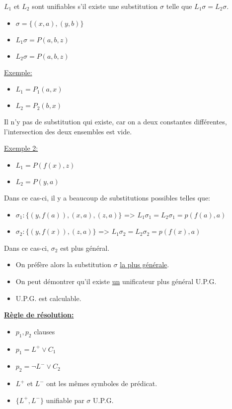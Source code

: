 \vspace{5 mm}
$L_1$ et $L_2$ sont unifiables s'il existe une substitution $\sigma$ telle que $L_1 \sigma = L_2 \sigma$.
\begin{itemize}
  \item $\sigma = \big\{(x,a),(y,b)\big\}$
  \item $L_1 \sigma = P(a,b,z)$
  \item $L_2 \sigma = P(a,b,z)$
\end{itemize}

\vspace{5 mm}
\underline{Exemple:}
\begin{itemize}
  \item $L_1 = P_1(a,x)$
  \item $L_2 = P_2(b,x)$
\end{itemize}

Il n'y pas de substitution qui existe, car on a deux constantes différentes, l'intersection des deux ensembles est vide.
\smallskip

\underline{Exemple 2:}

\begin{itemize}
  \item $L_1 = P(f(x), z)$ 
  \item $L_2 = P(y, a)$
\end{itemize}

Dans ce cas-ci, il y a beaucoup de substitutions possibles telles que:
\begin{itemize}
  \item $\sigma_1 : \big\{ (y, f(a)), (x,a), (z,a) \big\}$ => $L_1 \sigma_1 = L_2 \sigma_1 = p(f(a), a)$
  \item $\sigma_2 : \big\{ (y, f(x)), (z,a) \big\}$ \hspace{11 mm}=> $L_1 \sigma_2 = L_2 \sigma_2 = p(f(x), a)$
\end{itemize}
Dans ce cas-ci, $\sigma_2$ est plus général.\\

\smallskip
\begin{itemize}
  \item On préfère alors la substitution $\sigma$ \underline{la plus générale}.
  \item On peut démontrer qu'il existe \underline{un} unificateur plus général U.P.G.
  \item U.P.G. est calculable.
\end{itemize}

\vspace{5 mm}
\textbf{\underline{Règle de résolution:}}
\begin{itemize}
  \item $p_1, p_2$ clauses
  \item $p_1 = L^{+} \vee C_1$
  \item $p_2 = \neg L^{-} \vee C_2$
  \item $ L^{+}$ et $L^{-}$ ont les mêmes symboles de prédicat.
  \item $ \big\{L^{+}, L^{-}\big\}$ unifiable par $\sigma$ U.P.G.
\end{itemize}

